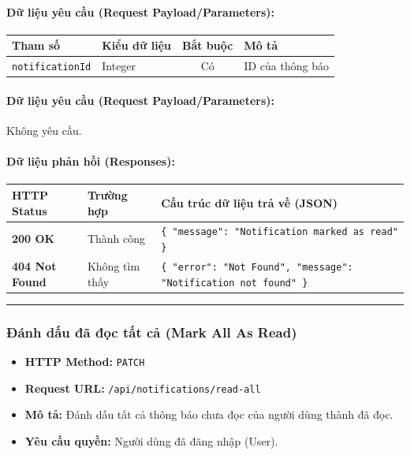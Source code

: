 \documentclass[12pt,a4paper]{article}
\begin{document}
\paragraph{Dữ liệu yêu cầu (Request Payload/Parameters):}
\begin{longtable}{|>{\raggedright\arraybackslash}p{2.8cm}|>{\raggedright\arraybackslash}p{2.2cm}|c|>{\raggedright\arraybackslash}p{7.0cm}|}
\hline
\textbf{Tham số} & \textbf{Kiểu dữ liệu} & \textbf{Bắt buộc} & \textbf{Mô tả} \\ \hline
\endhead
\texttt{notificationId} & Integer & Có & ID của thông báo \\ \hline
\end{longtable}

\paragraph{Dữ liệu yêu cầu (Request Payload/Parameters):}
Không yêu cầu.\\

\paragraph{Dữ liệu phản hồi (Responses):}
\begin{longtable}{|>{\raggedright\arraybackslash}p{2.8cm}|>{\raggedright\arraybackslash}p{3.2cm}|>{\raggedright\arraybackslash}p{8.0cm}|}
\hline
\textbf{HTTP Status} & \textbf{Trường hợp} & \textbf{Cấu trúc dữ liệu trả về (JSON)} \\ \hline
\endhead
\textbf{200 OK} & Thành công & \texttt{\{ "message": "Notification marked as read" \}} \\ \hline
\textbf{404 Not Found} & Không tìm thấy & \texttt{\{ "error": "Not Found", "message": "Notification not found" \}} \\ \hline
\end{longtable}

\vskip 0.4cm
\noindent\rule{\textwidth}{0.3pt}
\vskip 0.4cm

\subsubsection{Đánh dấu đã đọc tất cả (Mark All As Read)}
\begin{itemize}[leftmargin=*]
    \item \textbf{HTTP Method:} \texttt{PATCH}
    \item \textbf{Request URL:} \texttt{/api/notifications/read-all}
    \item \textbf{Mô tả:} Đánh dấu tất cả thông báo chưa đọc của người dùng thành đã đọc.
    \item \textbf{Yêu cầu quyền:} Người dùng đã đăng nhập (User).
\end{itemize}
\end{document}
